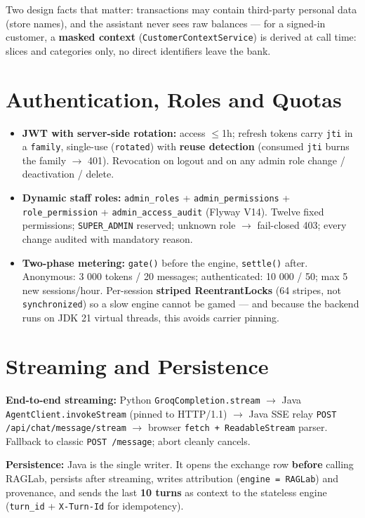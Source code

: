 \documentclass[a4paper,12pt]{report}
\begin{document}
\noindent Two design facts that matter: transactions may contain third-party personal data (store names), and the assistant never sees raw balances --- for a signed-in customer, a \textbf{masked context} (\texttt{CustomerContextService}) is derived at call time: slices and categories only, no direct identifiers leave the bank.

\section{Authentication, Roles and Quotas}

\begin{itemize}[leftmargin=1.2cm, itemsep=2pt]
\item \textbf{JWT with server-side rotation:} access $\leq$1h; refresh tokens carry \texttt{jti} in a \texttt{family}, single-use (\texttt{rotated}) with \textbf{reuse detection} (consumed \texttt{jti} burns the family $\rightarrow$ 401). Revocation on logout and on any admin role change / deactivation / delete.
\item \textbf{Dynamic staff roles:} \texttt{admin\_roles} + \texttt{admin\_permissions} + \texttt{role\_permission} + \texttt{admin\_access\_audit} (Flyway V14). Twelve fixed permissions; \texttt{SUPER\_ADMIN} reserved; unknown role $\rightarrow$ fail-closed 403; every change audited with mandatory reason.
\item \textbf{Two-phase metering:} \texttt{gate()} before the engine, \texttt{settle()} after. Anonymous: 3 000 tokens / 20 messages; authenticated: 10 000 / 50; max 5 new sessions/hour. Per-session \textbf{striped ReentrantLocks} (64 stripes, not \texttt{synchronized}) so a slow engine cannot be gamed --- and because the backend runs on JDK 21 virtual threads, this avoids carrier pinning.
\end{itemize}

\section{Streaming and Persistence}

\textbf{End-to-end streaming:} Python \texttt{GroqCompletion.stream} $\rightarrow$ Java \texttt{AgentClient.invokeStream} (pinned to HTTP/1.1) $\rightarrow$ Java SSE relay \texttt{POST /api/chat/message/stream} $\rightarrow$ browser \texttt{fetch + ReadableStream} parser. Fallback to classic \texttt{POST /message}; abort cleanly cancels.

\textbf{Persistence:} Java is the single writer. It opens the exchange row \textbf{before} calling RAGLab, persists after streaming, writes attribution (\texttt{engine = RAGLab}) and provenance, and sends the last \textbf{10 turns} as context to the stateless engine (\texttt{turn\_id} + \texttt{X-Turn-Id} for idempotency).
\end{document}
